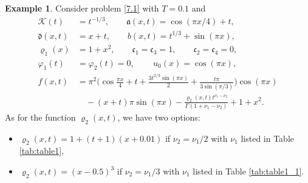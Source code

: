 \documentclass[reqno]{amsart}
\theoremstyle{definition}
\numberwithin{equation}{section}
\newtheorem{exAPP}{Example}[section]
\begin{document}
\begin{exAPP}\label{e.1}
Consider problem \eqref{7.1} with  $T=0.1$ and
\begin{align*}
\mathcal{K}(t)  &= t^{-1/3}, \qquad  \mathfrak{a}(x,t) = \cos(\pi x / 4) +t,\\
  \mathfrak{d}(x,t) &= x+t,\qquad  b(x,t) = t^{1/3}+\sin(\pi x),\\
  \varrho_1(x) &= 1+x^2,\qquad \mathfrak{c}_{1} = \mathfrak{c}_{3}=1,\qquad \mathfrak{c}_{2}=\mathfrak{c}_{4}=0,\\
 \varphi_{1}(t)&=\varphi_{2}(t)=0, \qquad  \, u_{0}(x) = \cos(\pi x), \\
f(x,t)&= \pi^2 \Big(\cos\frac{\pi x}{4} + t+ \frac{3t^{2/3}\sin(\pi x) }{2} + \frac{t \pi }{3\sin(\pi/3)}\Big)\cos(\pi x)  \\
& \quad- (x+t)\pi\sin(\pi x)  - \frac{\varrho_2(x,t) t^{\nu_1-\nu_2}}{\Gamma(1+\nu_1-\nu_2)}+1+x^2.
\end{align*}
As for the function  $\varrho_2(x,t)$, we have two options:
\begin{itemize}
\smallskip
\item[(i)] $\varrho_2(x,t) = 1+(t+1)(x+0.01)$ if $\nu_2=\nu_1/2$ with $\nu_{1}$ listed in Table \ref{tab:table1},
\smallskip
\item[(ii)]$\varrho_2(x,t) = (x-0.5)^{3}$ if $\nu_2=\nu_{1}/3$ with $\nu_{1}$ listed in Table \ref{tab:table1_1}.
\end{itemize}


\end{exAPP}
\end{document}
